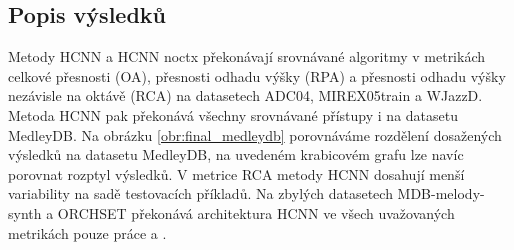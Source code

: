 \begin{table}[p]
\centering
{}%
\caption{Výsledky přesnosti odhadu výšky nezávisle na oktávě (Raw Chroma Accuracy). Vyznačené výsledky jsou pro daný dataset nejvyšší z porovnávaných v rámci daného datasetu.}\label{tab:vysledky_RCA}
\end{table}

\subsection{Popis výsledků}

Metody HCNN a HCNN noctx překonávají srovnávané algoritmy v metrikách celkové přesnosti (OA), přesnosti odhadu výšky (RPA) a přesnosti odhadu výšky nezávisle na oktávě (RCA) na datasetech ADC04, MIREX05train a WJazzD. Metoda HCNN pak překonává všechny srovnávané přístupy i na datasetu MedleyDB. Na obrázku \ref{obr:final_medleydb} porovnáváme rozdělení dosažených výsledků na datasetu MedleyDB, na uvedeném krabicovém grafu lze navíc porovnat rozptyl výsledků. V metrice RCA metody HCNN dosahují menší variability na sadě testovacích příkladů. Na zbylých datasetech MDB-melody-synth a ORCHSET překonává architektura HCNN ve všech uvažovaných metrikách pouze práce \cite{Salamon2012a} a \cite{Bittner2017}.

